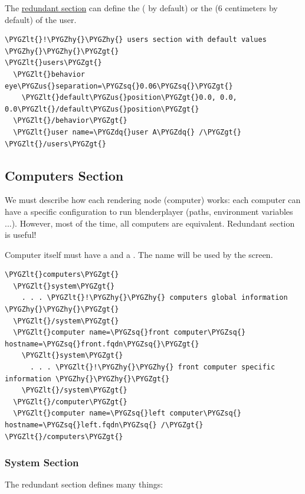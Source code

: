 \documentclass[a4,10pt,openany,oneside]{sphinxmanual}
\def\PYGZus{\char`\_}
\def\PYGZlt{\char`\<}
\def\PYGZgt{\char`\>}
\def\PYGZhy{\char`\-}
\def\PYGZsq{\char`\'}
\def\PYGZdq{\char`\"}
\begin{document}
The  {\hyperref[components/configuration-file:redundant-sections]{redundant section}} can define the  ( by default) or the  (6 centimeters by default) of the user.

\begin{Verbatim}[commandchars=\\\{\}]
\PYGZlt{}!\PYGZhy{}\PYGZhy{} users section with default values \PYGZhy{}\PYGZhy{}\PYGZgt{}
\PYGZlt{}users\PYGZgt{}
  \PYGZlt{}behavior eye\PYGZus{}separation=\PYGZsq{}0.06\PYGZsq{}\PYGZgt{}
    \PYGZlt{}default\PYGZus{}position\PYGZgt{}0.0, 0.0, 0.0\PYGZlt{}/default\PYGZus{}position\PYGZgt{}
  \PYGZlt{}/behavior\PYGZgt{}
  \PYGZlt{}user name=\PYGZdq{}user A\PYGZdq{} /\PYGZgt{}
\PYGZlt{}/users\PYGZgt{}
\end{Verbatim}


\subsection{Computers Section}
\label{components/configuration-file:computers-section}
We must describe how each rendering node (computer) works: each computer can have a specific configuration to run blenderplayer (paths, environment variables ...).
However, most of the time, all computers are equivalent. Redundant section is useful!

Computer itself must have a  and a . The name will be used by the screen.

\begin{Verbatim}[commandchars=\\\{\}]
\PYGZlt{}computers\PYGZgt{}
  \PYGZlt{}system\PYGZgt{}
    . . . \PYGZlt{}!\PYGZhy{}\PYGZhy{} computers global information \PYGZhy{}\PYGZhy{}\PYGZgt{}
  \PYGZlt{}/system\PYGZgt{}
  \PYGZlt{}computer name=\PYGZsq{}front computer\PYGZsq{} hostname=\PYGZsq{}front.fqdn\PYGZsq{}\PYGZgt{}
    \PYGZlt{}system\PYGZgt{}
      . . . \PYGZlt{}!\PYGZhy{}\PYGZhy{} front computer specific information \PYGZhy{}\PYGZhy{}\PYGZgt{}
    \PYGZlt{}/system\PYGZgt{}
  \PYGZlt{}/computer\PYGZgt{}
  \PYGZlt{}computer name=\PYGZsq{}left computer\PYGZsq{} hostname=\PYGZsq{}left.fqdn\PYGZsq{} /\PYGZgt{}
\PYGZlt{}/computers\PYGZgt{}
\end{Verbatim}


\subsubsection{System Section}
\label{components/configuration-file:system-section}
The  redundant section defines many things:
\end{document}
